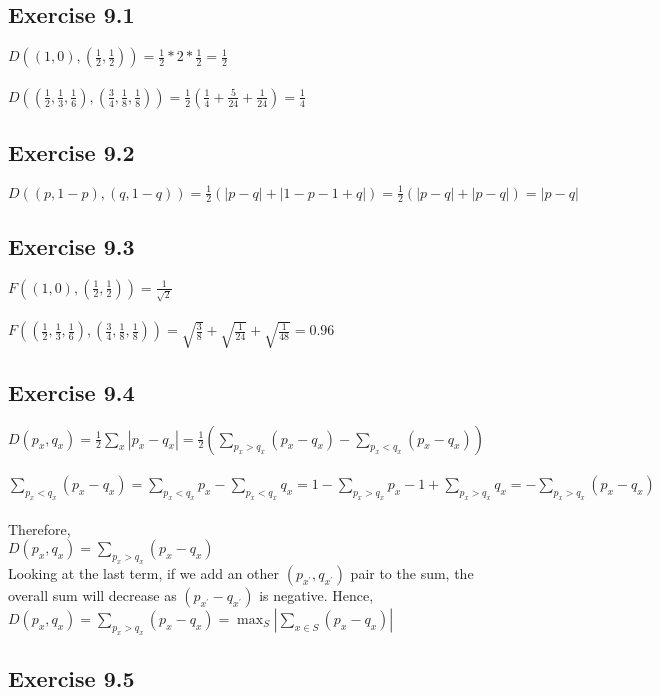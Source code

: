 \documentclass[a4paper,12pt]{article}
\begin{document}
\subsection*{Exercise 9.1}
$D((1,0),(\frac{1}{2}, \frac{1}{2}))=\frac{1}{2}*2*\frac{1}{2}=\frac{1}{2}$\\
\\
$D((\frac{1}{2},\frac{1}{3},\frac{1}{6}),(\frac{3}{4},\frac{1}{8}, \frac{1}{8}))=
\frac{1}{2}(\frac{1}{4}+\frac{5}{24}+\frac{1}{24})=\frac{1}{4}$
\subsection*{Exercise 9.2}
$D((p, 1-p),(q, 1-q))=\frac{1}{2}(|p-q|+|1-p-1+q|)=\frac{1}{2}(|p-q|+|p-q|)=|p-q|$
\subsection*{Exercise 9.3}
$F((1,0),(\frac{1}{2}, \frac{1}{2}))=\frac{1}{\sqrt{2}}$\\
\\
$F((\frac{1}{2},\frac{1}{3},\frac{1}{6}),(\frac{3}{4},\frac{1}{8}, \frac{1}{8}))=
\sqrt{\frac{3}{8}}+\sqrt{\frac{1}{24}}+\sqrt{\frac{1}{48}}=0.96$
\subsection*{Exercise 9.4}
$D(p_x,q_x)=\frac{1}{2}\displaystyle\sum_x|p_x-q_x|=\frac{1}{2}\left(\displaystyle\sum_{p_x> q_x}(p_x-q_x)-
\sum_{p_x< q_x}(p_x-q_x)\right)$\\
\\
$\displaystyle\sum_{p_x<q_x}(p_x-q_x)=\sum_{p_x<q_x}p_x-\sum_{p_x<q_x}q_x=1-\sum_{p_x>q_x}p_x-1+\sum_{p_x>q_x}q_x=
-\sum_{p_x>q_x}(p_x-q_x)$\\
\\
Therefore,\\
$D(p_x, q_x)=\displaystyle \sum_{p_x>q_x}(p_x-q_x)$\\
Looking at the last term, if we add an other $(p_{x^\prime},q_{x^\prime})$ pair to the sum, the overall sum
will decrease as $(p_{x^\prime}-q_{x^\prime})$ is negative. Hence,\\
$D(p_x, q_x)=\displaystyle \sum_{p_x>q_x}(p_x-q_x)=\displaystyle \max_S \left|\sum_{x\in S}(p_x-q_x)\right|$
\subsection*{Exercise 9.5}
\end{document}
